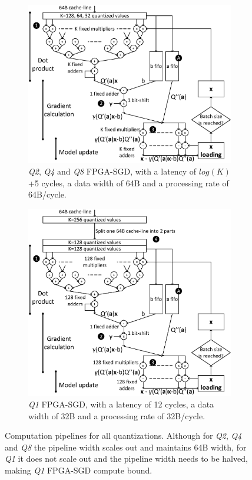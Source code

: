 \documentclass{article}
\begin{document}
\begin{figure}[t]
\centering
\begin{subfigure}[t]{.6\columnwidth}
\centering
\includegraphics[width=\columnwidth]{Figures/qFPGASGD.eps}
\caption{\textit{Q2}, \textit{Q4} and \textit{Q8} FPGA-SGD, with a latency of $log(K)$+5 cycles, a data width of 64B and a processing rate of 64B/cycle.}
\label{fig:qFPGASGD}
\end{subfigure}
\quad
\begin{subfigure}[t]{.6\columnwidth}
\centering
\includegraphics[width=\columnwidth]{Figures/q1FPGASGD.eps}
\caption{\textit{Q1} FPGA-SGD, with a latency of 12 cycles, a data width of 32B and a processing rate of 32B/cycle.}
\label{fig:q1FPGASGD}
\end{subfigure}
\caption{Computation pipelines for all quantizations. Although for \textit{Q2}, \textit{Q4} and \textit{Q8} the pipeline width scales out and maintains 64B width, for \textit{Q1} it does not scale out and the pipeline width needs to be halved, making \textit{Q1} FPGA-SGD compute bound.}
\label{fig:qallFPGASGD}
\end{figure}
\end{document}

